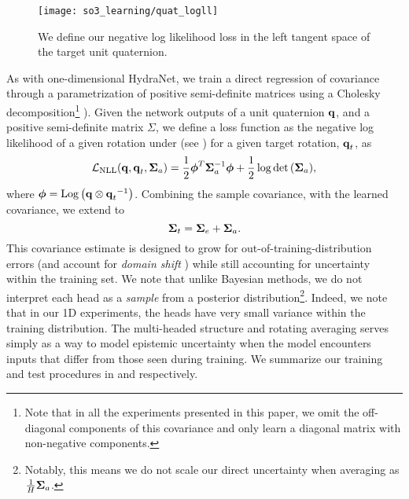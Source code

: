 \begin{wrapfigure}{r}{0.35\textwidth}
  \vspace{-20pt}
  \begin{center}
	\texttt{[image: so3\_learning/quat\_logll]}
  \end{center}
    \vspace{-20pt}
	\label{fig:math_quat_uncertainty}
	\caption{We define our negative log likelihood loss in the left tangent space of the target unit quaternion.}
\end{wrapfigure} 

As with one-dimensional HydraNet, we train a direct regression of covariance through a parametrization of positive semi-definite matrices using a Cholesky decomposition\footnote{Note that in all the experiments presented in this paper, we omit the off-diagonal components of this covariance and only learn a diagonal matrix with non-negative components.} \citep{Hu2015-uw,Haarnoja2016-ph}). Given the network outputs of a unit quaternion $\boldsymbol{\mathbf{q}}$, and a positive semi-definite matrix $\Sigma$, we define a loss function as the negative log likelihood of a given rotation under  (see \citep{Forster2015-af}) for a given target rotation, $\boldsymbol{\mathbf{q}}_t$, as
\begin{equation}
\label{eq:nll_loss}
\mathcal{L}_\mathrm{NLL}(\boldsymbol{\mathbf{q}}, \boldsymbol{\mathbf{q}}_t, \boldsymbol{\mathbf{\Sigma}}_a) = \frac{1}{2}\boldsymbol{\mathbf{\phi}}^T \boldsymbol{\mathbf{\Sigma}}_a^{-1}\boldsymbol{\mathbf{\phi}} + \frac{1}{2} \log{ \mathrm{det}\left( \boldsymbol{\mathbf{\Sigma}} _a\right) },
\end{equation}
\noindent where  $\boldsymbol{\mathbf{\phi}} = \mathrm{Log}\left({\boldsymbol{\mathbf{q}} \otimes { \boldsymbol{\mathbf{q}} _t}^{-1}}\right)$. Combining the sample covariance, with the learned covariance, we extend  to
\begin{equation}
\boldsymbol{\mathbf{\Sigma}}_t = \boldsymbol{\mathbf{\Sigma}}_e + \boldsymbol{\mathbf{\Sigma}}_a.
\end{equation}
This covariance estimate is designed to grow for out-of-training-distribution errors (and account for \textit{domain shift} \citep{Lakshminarayanan2017}) while still accounting for uncertainty within the training set. We note that unlike Bayesian methods, we do not interpret each head as a \textit{sample} from a posterior distribution\footnote{Notably, this means we do not scale our direct uncertainty when averaging as $\frac{1}{H}\boldsymbol{\mathbf{\Sigma}}_a$.}. Indeed, we note that in our 1D experiments, the heads have very small variance within the training distribution. The multi-headed structure and rotating averaging serves simply as a way to model epistemic uncertainty when the model encounters inputs that differ from those seen during training. We summarize our training and test procedures in  and  respectively.

